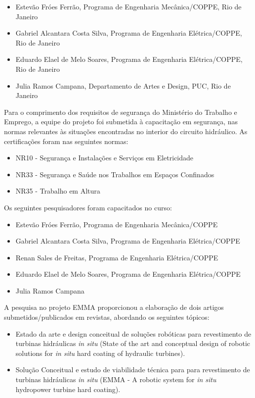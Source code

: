 \begin{itemize}
  \item Estevão Fróes Ferrão, Programa de Engenharia Mecânica/COPPE, Rio de
  Janeiro
  \item Gabriel Alcantara Costa Silva, Programa de Engenharia Elétrica/COPPE,
  Rio de Janeiro
  \item Eduardo Elael de Melo Soares, Programa de Engenharia Elétrica/COPPE, Rio
  de Janeiro
  \item Julia Ramos Campana, Departamento de Artes e Design, PUC, Rio de Janeiro
\end{itemize}

Para o comprimento dos requisitos de segurança do Ministério do Trabalho e
Emprego, a equipe do projeto foi submetida à capacitação em segurança, nas
normas relevantes às situações encontradas no interior do circuito hidráulico. As certificações foram nas
seguintes normas:

\begin{itemize}
  \item NR10 - Segurança e Instalações e Serviços em Eletricidade
  \item NR33 - Segurança e Saúde nos Trabalhos em Espaços Confinados
  \item NR35 - Trabalho em Altura
\end{itemize}

Os seguintes pesquisadores foram capacitados no curso:

\begin{itemize}
  \item Estevão Fróes Ferrão, Programa de Engenharia Mecânica/COPPE
  \item Gabriel Alcantara Costa Silva, Programa de Engenharia Elétrica/COPPE
  \item Renan Sales de Freitas, Programa de Engenharia Elétrica/COPPE
  \item Eduardo Elael de Melo Soares, Programa de Engenharia Elétrica/COPPE
  \item Julia Ramos Campana %
\end{itemize}
A pesquisa no projeto EMMA proporcionou a elaboração de dois artigos
submetidos/publicados em revistas, abordando os seguintes tópicos: 

\begin{itemize}
  \item Estado da arte e design conceitual de soluções robóticas para
  revestimento de turbinas hidráulicas \textit{in situ} (State of the art and
  conceptual design of robotic solutions for \textit{in situ} hard coating of
  hydraulic turbines).
  \item Solução Conceitual e estudo de viabilidade técnica para para
  revestimento de turbinas hidráulicas \textit{in situ} (EMMA - A robotic
  system for \textit{in situ} hydropower turbine hard coating).
\end{itemize}

